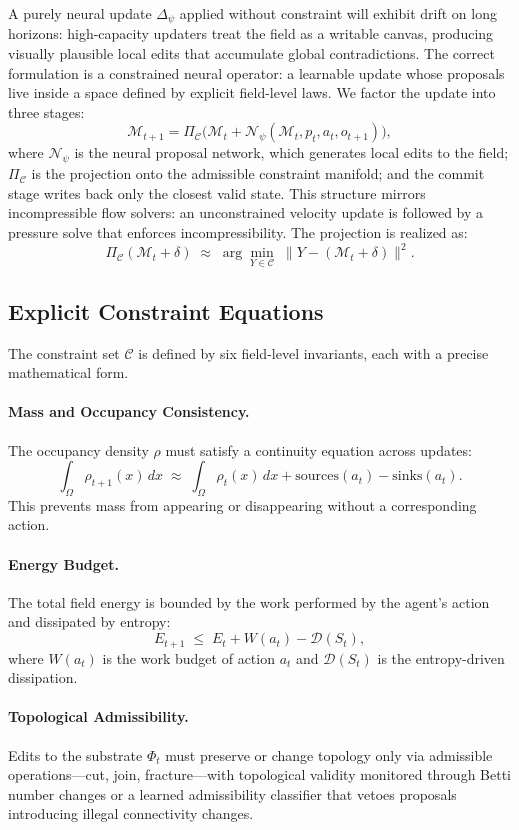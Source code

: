 \documentclass[11pt]{article}
\begin{document}
A purely neural update $\Delta_\psi$ applied without constraint will
exhibit drift on long horizons: high-capacity updaters treat the field as
a writable canvas, producing visually plausible local edits that accumulate
global contradictions.
The correct formulation is a constrained neural operator: a learnable
update whose proposals live inside a space defined by explicit field-level
laws.
We factor the update into three stages:
\[
\mathcal{M}_{t+1}
=
\Pi_{\mathcal{C}}\!\Big(
\mathcal{M}_t
+
\mathcal{N}_\psi(\mathcal{M}_t, p_t, a_t, o_{t+1})
\Big),
\]
where $\mathcal{N}_\psi$ is the neural proposal network, which generates
local edits to the field; $\Pi_{\mathcal{C}}$ is the projection onto the
admissible constraint manifold; and the commit stage writes back only the
closest valid state.
This structure mirrors incompressible flow solvers: an unconstrained
velocity update is followed by a pressure solve that enforces
incompressibility.
The projection is realized as:
\[
\Pi_{\mathcal{C}}(\mathcal{M}_t + \delta)
\;\approx\;
\arg\min_{Y \in \mathcal{C}}\;
\|Y - (\mathcal{M}_t + \delta)\|^2.
\]

\subsection{Explicit Constraint Equations}

The constraint set $\mathcal{C}$ is defined by six field-level invariants,
each with a precise mathematical form.

\paragraph{Mass and Occupancy Consistency.}
The occupancy density $\rho$ must satisfy a continuity equation across
updates:
\[
\int_\Omega \rho_{t+1}(x)\, dx
\;\approx\;
\int_\Omega \rho_t(x)\, dx
+ \text{sources}(a_t)
- \text{sinks}(a_t).
\]
This prevents mass from appearing or disappearing without a corresponding
action.

\paragraph{Energy Budget.}
The total field energy is bounded by the work performed by the agent's
action and dissipated by entropy:
\[
E_{t+1} \;\le\; E_t + W(a_t) - \mathcal{D}(S_t),
\]
where $W(a_t)$ is the work budget of action $a_t$ and $\mathcal{D}(S_t)$
is the entropy-driven dissipation.

\paragraph{Topological Admissibility.}
Edits to the substrate $\Phi_t$ must preserve or change topology only via
admissible operations---cut, join, fracture---with topological validity
monitored through Betti number changes or a learned admissibility
classifier that vetoes proposals introducing illegal connectivity changes.
\end{document}
